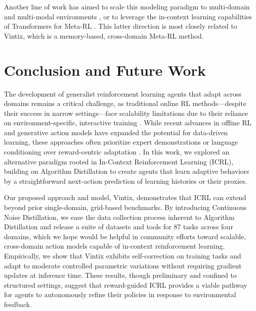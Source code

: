 \documentclass{article}
\theoremstyle{plain}
\theoremstyle{definition}
\theoremstyle{remark}
\begin{document}
Another line of work has aimed to scale this modeling paradigm to multi-domain and multi-modal environments \cite{reed2022generalistagent, gallouédec2024jacktradesmastersome}, or to leverage the in-context learning capabilities of Transformers for Meta-RL \cite{laskin2022incontextreinforcementlearningalgorithm, lee2023supervisedpretraininglearnincontext}. This latter direction is most closely related to Vintix, which is a memory-based, cross-domain Meta-RL method.

\section{Conclusion and Future Work}
The development of generalist reinforcement learning agents that adapt across domains remains a critical challenge, as traditional online RL methods—despite their success in narrow settings—face scalability limitations due to their reliance on environment-specific, interactive training \cite{dulac2019challenges, levine2020offlinereinforcementlearningtutorial}. While recent advances in offline RL and generative action models have expanded the potential for data-driven learning, these approaches often prioritize expert demonstrations or language conditioning over reward-centric adaptation \cite{reed2022generalistagent, gallouédec2024jacktradesmastersome, haldar2024bakuefficienttransformermultitask, embodimentcollaboration2024openxembodimentroboticlearning, schmied2024large, sridhar2024regent}. In this work, we explored an alternative paradigm rooted in In-Context Reinforcement Learning (ICRL), building on Algorithm Distillation \cite{laskin2022incontextreinforcementlearningalgorithm} to create agents that learn adaptive behaviors by a straightforward next-action prediction of learning histories or their proxies.

Our proposed approach and model, Vintix, demonstrates that ICRL can extend beyond prior single-domain, grid-based benchmarks. By introducing Continuous Noise Distillation, we ease the data collection process inherent to Algorithm Distillation and release a suite of datasets and tools for 87 tasks across four domains, which we hope would be helpful in community efforts toward scalable, cross-domain action models capable of in-context reinforcement learning. Empirically, we show that Vintix exhibits self-correction on training tasks and adapt to moderate controlled parametric variations without requiring gradient updates at inference time. These results, though preliminary and confined to structured settings, suggest that reward-guided ICRL provides a viable pathway for agents to autonomously refine their policies in response to environmental feedback.
\end{document}
